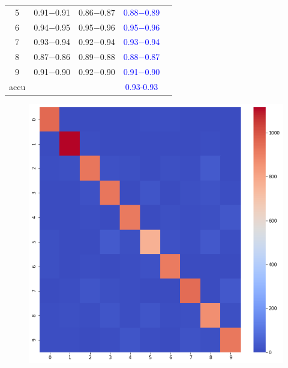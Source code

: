 \documentclass[paper=letter, fontsize=11pt]{scrartcl}
\numberwithin{equation}{section} %
\numberwithin{figure}{section} %
\numberwithin{table}{section} %
\begin{document}
\begin{table}[H]
\begin{minipage}{.5\linewidth}
\begin{tabular}{|c|c|c|c|c}
5       &  0.91$-$0.91 &0.86$-$0.87 &  \textcolor{blue}{0.88$-$0.89}\\  
6       &  0.94$-$0.95 &0.95$-$0.96 &  \textcolor{blue}{0.95$-$0.96}\\  
7       &  0.93$-$0.94 &0.92$-$0.94 &  \textcolor{blue}{0.93$-$0.94}\\  
8       &  0.87$-$0.86 &0.89$-$0.88 &  \textcolor{blue}{0.88$-$0.87}\\  
9       &  0.91$-$0.90 &0.92$-$0.90 &  \textcolor{blue}{0.91$-$0.90}\\  \hline \hline
accu  & & & \textcolor{blue}{0.93-0.93}\\ \hline \hline
        \end{tabular}
    \end{minipage} 
\end{table}
\begin{figure}[!htb]
  \includegraphics[width=\linewidth]{figure/log_reg_confusion.png}
\endminipage\hfill
{}

\end{figure}
\end{document}
